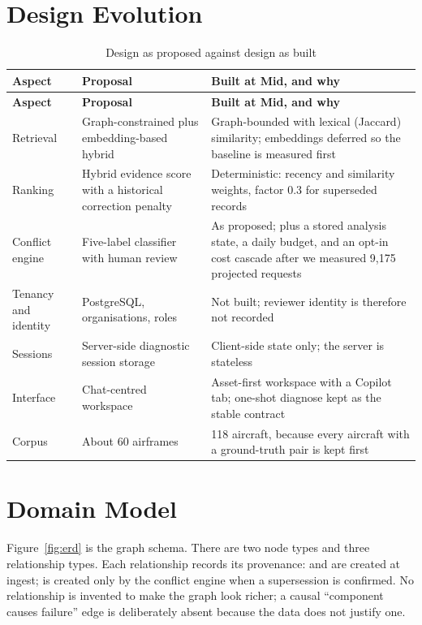 \section{Design Evolution}
\begin{longtable}{p{}p{}p{}}
\caption{Design as proposed against design as built}\label{tab:evolution}\\
\toprule \textbf{Aspect} & \textbf{Proposal} & \textbf{Built at Mid, and why} \\ \midrule \endfirsthead
\toprule \textbf{Aspect} & \textbf{Proposal} & \textbf{Built at Mid, and why} \\ \midrule \endhead
Retrieval & Graph-constrained plus embedding-based hybrid & Graph-bounded with lexical (Jaccard) similarity; embeddings deferred so the baseline is measured first \\
Ranking & Hybrid evidence score with a historical correction penalty & Deterministic: recency and similarity weights, factor 0.3 for superseded records \\
Conflict engine & Five-label classifier with human review & As proposed; plus a stored analysis state, a daily budget, and an opt-in cost cascade after we measured 9,175 projected requests \\
Tenancy and identity & PostgreSQL, organisations, roles & Not built; reviewer identity is therefore not recorded \\
Sessions & Server-side diagnostic session storage & Client-side state only; the server is stateless \\
Interface & Chat-centred workspace & Asset-first workspace with a Copilot tab; one-shot diagnose kept as the stable contract \\
Corpus & About 60 airframes & 118 aircraft, because every aircraft with a ground-truth pair is kept first \\
\bottomrule
\end{longtable}

\section{Domain Model}
Figure~\ref{fig:erd} is the graph schema. There are two node types and three relationship types. Each relationship records its provenance:  and  are created at ingest;  is created only by the conflict engine when a supersession is confirmed. No relationship is invented to make the graph look richer; a causal ``component causes failure'' edge is deliberately absent because the data does not justify one.

